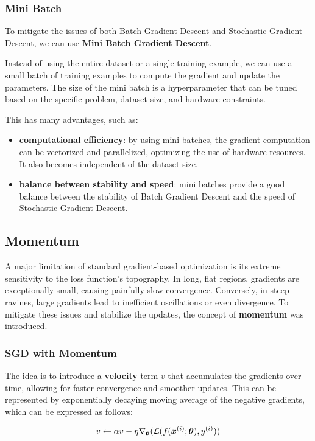 \subsubsection{Mini Batch}
To mitigate the issues of both Batch Gradient Descent and Stochastic Gradient Descent, we can use \textbf{Mini Batch Gradient Descent}.

Instead of using the entire dataset or a single training example, we can use a small batch of training examples to compute the gradient and update the parameters.
The size of the mini batch is a hyperparameter that can be tuned based on the specific problem, dataset size, and hardware constraints.

This has many advantages, such as:
\begin{itemize}
    \item \textbf{computational efficiency}: by using mini batches, the gradient computation can be vectorized and parallelized,
    optimizing the use of hardware resources. It also becomes independent of the dataset size.
    \item \textbf{balance between stability and speed}: mini batches provide a good balance between the stability of Batch Gradient Descent and the speed of Stochastic Gradient Descent.
\end{itemize}

\subsection{Momentum}
A major limitation of standard gradient-based optimization is its extreme sensitivity to the loss function's topography. 
In long, flat regions, gradients are exceptionally small, causing painfully slow convergence. 
Conversely, in steep ravines, large gradients lead to inefficient oscillations or even divergence. 
To mitigate these issues and stabilize the updates, the concept of \textbf{momentum} was introduced.

\subsubsection{SGD with Momentum}
The idea is to introduce a \textbf{velocity} term $v$ that accumulates the gradients over time, allowing for faster convergence and smoother updates.
This can be represented by exponentially decaying moving average of the negative gradients, which can be expressed as follows:

\begin{equation*}
    v \leftarrow \alpha v - \eta \nabla_{\boldsymbol{\theta}} (\mathcal{L}(f(\boldsymbol{x}^{(i)}; \boldsymbol{\theta}), y^{(i)}))
\end{equation*}

